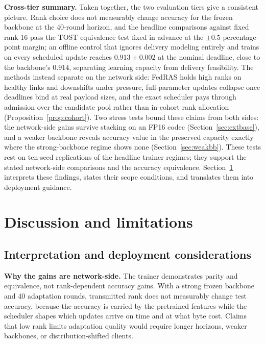 \documentclass[a4paper,fleqn]{cas-dc}
\begin{document}
\textbf{Cross-tier summary.} Taken together, the two evaluation tiers give a consistent picture. Rank choice does not measurably change accuracy for the frozen backbone at the 40-round horizon, and the headline comparisons against fixed rank 16 pass the TOST equivalence test fixed in advance at the $\pm0.5$ percentage-point margin; an offline control that ignores delivery modeling entirely and trains on every scheduled update reaches $0.913\pm0.002$ at the nominal deadline, close to the backbone's $0.914$, separating learning capacity from delivery feasibility. The methods instead separate on the network side: FedRAS holds high ranks on healthy links and downshifts under pressure, full-parameter updates collapse once deadlines bind at real payload sizes, and the exact scheduler pays through admission over the candidate pool rather than in-cohort rank allocation (Proposition~\ref{prop:cohort}). Two stress tests bound these claims from both sides: the network-side gains survive stacking on an FP16 codec (Section~\ref{sec:extbase}), and a weaker backbone reveals accuracy value in the preserved capacity exactly where the strong-backbone regime shows none (Section~\ref{sec:weakbb}). These tests rest on ten-seed replications of the headline trainer regimes; they support the stated network-side comparisons and the accuracy equivalence. Section~\ref{sec:discussion} interprets these findings, states their scope conditions, and translates them into deployment guidance.

\section{Discussion and limitations}
\label{sec:discussion}
\subsection{Interpretation and deployment considerations}
\textbf{Why the gains are network-side.} The trainer demonstrates parity and equivalence, not rank-dependent accuracy gains. With a strong frozen backbone and 40 adaptation rounds, transmitted rank does not measurably change test accuracy, because the accuracy is carried by the pretrained features while the scheduler shapes which updates arrive on time and at what byte cost. Claims that low rank limits adaptation quality would require longer horizons, weaker backbones, or distribution-shifted clients.
\end{document}
